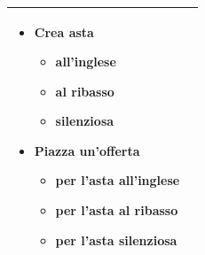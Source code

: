 {\begin{tabular}{|l|p{330pt}|}
\begin{itemize}[leftmargin=15pt]
		\end{itemize}\medskip
		\begin{itemize}[leftmargin=15pt]
			\setlength{\itemsep}{0pt}  %
			\setlength{\parskip}{0pt}  %
			\item Crea asta
			      \begin{itemize}
				      \item all'inglese
				      \item al ribasso
				      \item silenziosa
			      \end{itemize}
		\end{itemize}\medskip
		\begin{itemize}[leftmargin=15pt]
			\setlength{\itemsep}{0pt}  %
			\setlength{\parskip}{0pt}  %
			\item Piazza un'offerta
			      \begin{itemize}
				      \item per l'asta all'inglese
				      \item per l'asta al ribasso
				      \item per l'asta silenziosa
			      \end{itemize}
		\end{itemize}                     \\ \hline
	\end{tabular}
}

